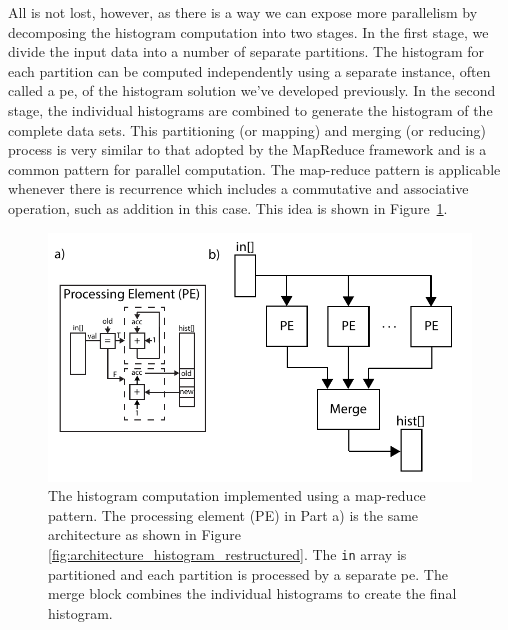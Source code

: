 All is not lost, however, as there is a way we can expose more parallelism by decomposing the histogram computation into two stages.  In the first stage, we divide the input data into a number of separate partitions.  The histogram for each partition can be computed independently using a separate instance, often called a \gls{pe}, of the histogram solution we've developed previously.  In the second stage, the individual histograms are combined to generate the histogram of the complete data sets.  This partitioning (or mapping) and merging (or reducing) process is very similar to that adopted by the MapReduce framework \cite{dean08mapreduce} and is a common pattern for parallel computation.  The map-reduce pattern is applicable whenever there is recurrence which includes a commutative and associative operation, such as addition in this case. This idea is shown in Figure~\ref{fig:architecture_histogram_parallel}. 

\begin{figure}
\centering
\includegraphics[width=  .9\textwidth]{images/architectures_histogram_parallel}
\caption{The histogram computation implemented using a map-reduce pattern.  The processing element (PE) in Part a) is the same architecture as shown in Figure \ref{fig:architecture_histogram_restructured}. The \lstinline|in| array is partitioned and each partition is processed by a separate \gls{pe}. The merge block combines the individual histograms to create the final histogram.  }
\label{fig:architecture_histogram_parallel}
\end{figure}

